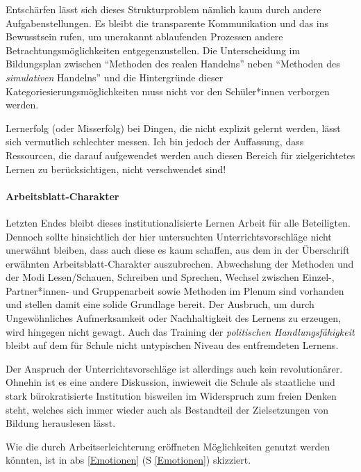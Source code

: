 Entschärfen lässt sich dieses Strukturproblem nämlich kaum durch andere Aufgabenstellungen. Es bleibt die transparente Kommunikation und das ins Bewusstsein rufen, um unerakannt ablaufenden Prozessen andere Betrachtungsmöglichkeiten entgegenzustellen. 
Die Unterscheidung im Bildungsplan zwischen \enquote{Methoden des realen Handelns} \autocite[13]{bplan} neben \enquote{Methoden des \emph{simulativen} Handelns} \autocite[14]{bplan} und die Hintergründe dieser Kategoriesierungsmöglichkeiten muss nicht vor den Schüler*innen verborgen werden. 
\bigskip

Lernerfolg (oder Misserfolg) bei Dingen, die nicht explizit gelernt werden, lässt sich vermutlich schlechter messen. Ich bin jedoch der Auffassung, dass Ressourcen, die darauf aufgewendet werden auch diesen Bereich für zielgerichtetes Lernen zu berücksichtigen, nicht verschwendet sind! 


\paragraph{Arbeitsblatt-Charakter}
Letzten Endes bleibt dieses institutionalisierte Lernen Arbeit für alle Beteiligten. Dennoch sollte hinsichtlich der hier untersuchten Unterrichtsvorschläge nicht unerwähnt bleiben, dass auch diese es kaum schaffen, aus dem in der Überschrift erwähnten Arbeitsblatt-Charakter auszubrechen. Abwechslung der Methoden und der Modi Lesen/Schauen, Schreiben und Sprechen, Wechsel zwischen Einzel-, Partner*innen- und Gruppenarbeit sowie Methoden im Plenum sind vorhanden und stellen damit eine solide Grundlage bereit. Der Ausbruch, um durch Ungewöhnliches Aufmerksamkeit oder Nachhaltigkeit des Lernens zu erzeugen, wird hingegen nicht gewagt. 
Auch das Training der \emph{politischen Handlungsfähigkeit} bleibt auf dem für Schule nicht untypischen Niveau des entfremdeten Lernens. 

Der Anspruch der Unterrichtsvorschläge ist allerdings auch kein revolutionärer. Ohnehin ist es eine andere Diskussion, inwieweit die Schule als staatliche und stark bürokratisierte Institution bisweilen im Widerspruch zum freien Denken steht, welches sich immer wieder auch als Bestandteil der Zielsetzungen von Bildung herauslesen lässt. 

Wie die durch Arbeitserleichterung eröffneten Möglichkeiten genutzt werden könnten, ist in \gls{abs} \ref{Emotionen} (\gls{S} \ref{Emotionen}) skizziert. 






